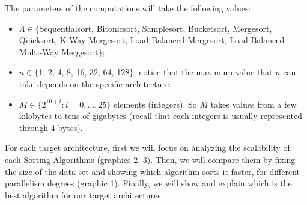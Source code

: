 The parameters of the computations will take the following values:
\begin{itemize}
\item $\Lambda \in \lbrace$Sequentialsort, Bitonicsort, Samplesort, Bucketsort, Mergesort, Quicksort, K-Way Mergesort, Load-Balanced Mergesort, Load-Balanced Multi-Way Mergesort$\rbrace$;
\item $n \in \lbrace$1, 2, 4, 8, 16, 32, 64, 128$\rbrace$; notice that the maximum value that $n$ can take depends on the specific architecture. 
\item $M \in \lbrace 2^{10 + i} : i = 0, ..., 25\rbrace$ elements (integers). So $M$ takes values from a few kilobytes to tens of gigabytes (recall that each integers is usually represented through 4 bytes).
\end{itemize} 

For each target architecture, first we will focus on analyzing the scalability of each Sorting Algorithms (graphics 2, 3). Then, we will compare them by fixing the size of the data set and showing which algorithm sorts it faster, for different parallelism degrees (graphic 1). Finally, we will show and explain which is the best algorithm for our target architectures. 




